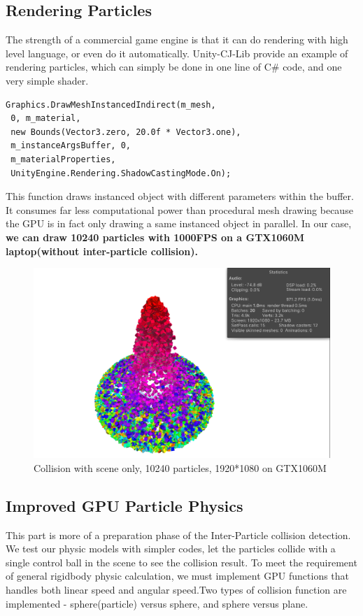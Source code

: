 \documentclass[acmtog]{acmart}
\begin{document}
\subsection{Rendering Particles}
The strength of a commercial game engine is that it can do rendering with high level language, or even do it automatically. Unity-CJ-Lib provide an example of rendering particles, which can simply be done in one line of C\# code, and one very simple shader.
\begin{lstlisting}
Graphics.DrawMeshInstancedIndirect(m_mesh,
 0, m_material, 
 new Bounds(Vector3.zero, 20.0f * Vector3.one),
 m_instanceArgsBuffer, 0,
 m_materialProperties, 
 UnityEngine.Rendering.ShadowCastingMode.On);
\end{lstlisting}
This function draws instanced object with different parameters within the buffer. It consumes far less computational power than procedural mesh drawing because the GPU is in fact only drawing a same instanced object in parallel. In our case, \textbf{we can draw 10240 particles with 1000FPS on a GTX1060M laptop(without inter-particle collision).} 
\begin{figure}[!h]
	\includegraphics[width=\linewidth]{2-1-framerate}
	\caption{Collision with scene only, 10240 particles, 1920*1080 on GTX1060M}
\end{figure}
\subsection{Improved GPU Particle Physics}
This part is more of a preparation phase of the Inter-Particle collision detection. We test our physic models with simpler codes, let the particles collide with a single control ball in the scene to see the collision result.
To meet the requirement of general rigidbody physic calculation, we must implement GPU functions that handles both linear speed and angular speed.Two types of collision function are implemented - sphere(particle) versus sphere, and sphere versus plane.
\end{document}
